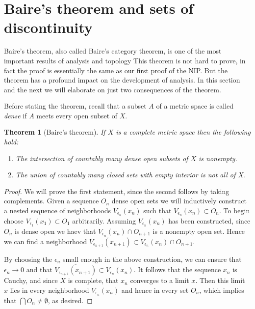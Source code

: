 \documentclass[11pt,oneside]{amsbook}
\theoremstyle{definition}
\theoremstyle{plain}
\newtheorem{thm}{Theorem}[section]
\theoremstyle{definition}
\theoremstyle{remark}
\numberwithin{equation}{section}
\numberwithin{figure}{section}
\begin{document}

\newpage
\section{Baire's theorem and sets of discontinuity}

Baire's theorem, also called Baire's category theorem, is one of the most important results of analysis and topology This theorem is not hard to prove, in fact the proof is essentially the same as our first proof of the NIP. But the theorem has a profound impact on the development of analysis. In this section and the next we will elaborate on just two consequences of the theorem.

Before stating the theorem, recall that a subset $A$ of a metric space is called \emph{dense} if $A$ meets every open subset of $X$.

\begin{thm}[Baire's theorem]
  If $X$ is a complete metric space then the following hold:
  \begin{enumerate}
  \item The intersection of countably many dense open subsets of $X$ is nonempty.
  \item The union of countably many closed sets with empty interior is not all of $X$.
  \end{enumerate}
\end{thm}

\begin{proof}
  We will prove the first statement, since the second follows by taking complements. Given a sequence $O_n$ dense open sets we will inductively construct a nested sequence of neighborhoods $V_{\epsilon_n}(x_n)$ such that $V_{\epsilon_n}(x_n)\subset O_n$. To begin choose $V_{\epsilon_1}(x_1)\subset O_1$ arbitrarily. Assuming $V_{\epsilon_n}(x_n)$ has been constructed, since $O_n$ is dense open we haev that $V_{\epsilon_n}(x_n)\cap O_{n+1}$ is a nonempty open set. Hence we can find a neighborhood $V_{\epsilon_{n+1}}(x_{n+1})\subset V_{\epsilon_n}(x_n)\cap O_{n+1}$.

  By choosing the $\epsilon_n$ small enough in the above construction, we can ensure that $\epsilon_n\to0$ and that $\overline{V_{\epsilon_{n+1}}(x_{n+1})}\subset V_{\epsilon_n}(x_n)$. It follows that the sequence $x_n$ is Cauchy, and since $X$ is complete, that $x_n$ converges to a limit $x$. Then this limit $x$ lies in every neighborhood $V_{\epsilon_n}(x_n)$ and hence in every set $O_n$, which implies that $\bigcap O_n\neq\emptyset$, as desired.
\end{proof}
\end{document}
